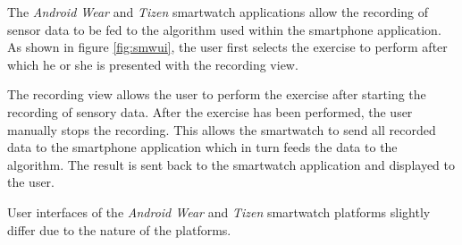 The \textit{Android Wear} and \textit{Tizen} smartwatch applications allow the
recording of sensor data to be fed to the algorithm used within the
smartphone application. As shown in figure \ref{fig:smwui}, the user first
selects the exercise to perform after which he or she is presented with the
recording view.

The recording view allows the user to perform the exercise after starting the
recording of sensory data. After the exercise has been performed, the user
manually stops the recording. This allows the smartwatch to send all recorded
data to the smartphone application which in turn feeds the data to the
algorithm. The result is sent back to the smartwatch application and displayed
to the user.

User interfaces of the \textit{Android Wear} and \textit{Tizen} smartwatch
platforms slightly differ due to the nature of the platforms.
